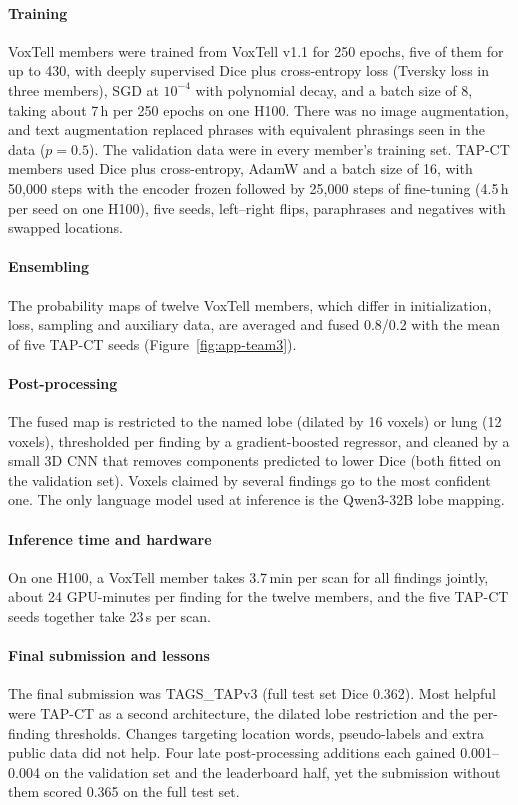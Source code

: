 \paragraph{Training} VoxTell members were trained from VoxTell v1.1 for 250
epochs, five of them for up to 430, with deeply supervised Dice plus
cross-entropy loss (Tversky loss in three members), SGD at $10^{-4}$ with
polynomial decay, and a batch size of 8, taking about 7\,h per 250 epochs on one
H100. There was no image augmentation, and text augmentation replaced phrases
with equivalent phrasings seen in the data ($p = 0.5$). The validation data were
in every member's training set. TAP-CT members used Dice plus cross-entropy,
AdamW and a batch size of 16, with 50,000 steps with the encoder frozen followed
by 25,000 steps of fine-tuning (4.5\,h per seed on one H100), five seeds,
left--right flips, paraphrases and negatives with swapped locations.

\paragraph{Ensembling} The probability maps of twelve VoxTell members, which
differ in initialization, loss, sampling and auxiliary data, are averaged and
fused 0.8/0.2 with the mean of five TAP-CT seeds (Figure~\ref{fig:app-team3}).

\paragraph{Post-processing} The fused map is restricted to the named lobe
(dilated by 16 voxels) or lung (12 voxels), thresholded per finding by a
gradient-boosted regressor, and cleaned by a small 3D CNN that removes components
predicted to lower Dice (both fitted on the validation set). Voxels claimed by
several findings go to the most confident one. The only language model used at
inference is the Qwen3-32B lobe mapping.

\paragraph{Inference time and hardware} On one H100, a VoxTell member takes
3.7\,min per scan for all findings jointly, about 24 GPU-minutes per finding for
the twelve members, and the five TAP-CT seeds together take 23\,s per scan.

\paragraph{Final submission and lessons} The final submission was TAGS\_TAPv3
(full test set Dice 0.362). Most helpful were TAP-CT as a second
architecture, the dilated lobe restriction and the per-finding thresholds.
Changes targeting location words, pseudo-labels and extra public data did not
help. Four late post-processing additions each gained 0.001--0.004 on the
validation set and the leaderboard half, yet the submission without them scored
0.365 on the full test set.

